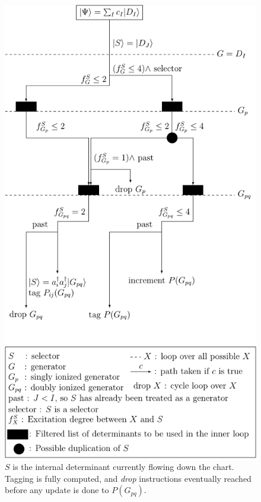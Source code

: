 \documentclass[./thesis.tex]{subfiles}
\begin{document}
\begin{figure}[h!]
        \begin{center}
                \includegraphics[height=0.90\textheight]{figures/cipsi/selection}
        \end{center}
        \caption{$S$ is the internal determinant currently flowing down the chart.
        Tagging is fully computed, and \emph{drop} instructions eventually reached before any update is done to $P(G_{pq})$.}
        \label{fig:selection}   
\end{figure}
\end{document}
